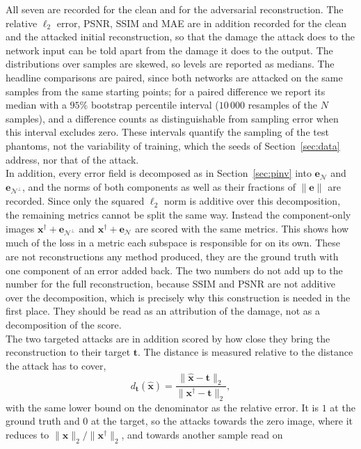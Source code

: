 \documentclass{article}
\numberwithin{equation}{section}
\begin{document}
All seven are recorded for the clean and for the adversarial reconstruction. The relative
$\ell_2$ error, PSNR, SSIM and MAE are in addition recorded for the clean and the attacked initial
reconstruction, so that the damage the attack does to the network input can be told apart from the
damage it does to the output.
The distributions over samples are skewed, so levels are reported as medians. The headline comparisons
are paired, since both networks are attacked on the same samples from the same starting points; for a
paired difference we report its median with a $95\%$ bootstrap percentile interval ($10\,000$ resamples
of the $N$ samples), and a difference counts as distinguishable from sampling error when this interval
excludes zero. These intervals quantify the sampling of the test phantoms, not the
variability of training, which the seeds of Section~\ref{sec:data} address, nor that of the attack.\\
In addition, every error field is decomposed as in Section~\ref{sec:pinv} into
$\mathbf{e}_\mathcal{N}$ and $\mathbf{e}_{\mathcal{N}^\perp}$, and the norms of
both components as well as their fractions of $\lVert\mathbf{e}\rVert$ are
recorded. Since only the squared $\ell_2$ norm is additive over this
decomposition, the remaining metrics cannot be split the same way.
Instead the component-only images $\mathbf{x}^\dagger+\mathbf{e}_{\mathcal{N}^\perp}$ and
$\mathbf{x}^\dagger+\mathbf{e}_\mathcal{N}$ are scored with the same metrics.
This shows how much of the loss in a metric each subspace is responsible for
on its own. These are not reconstructions any method produced, they are the ground truth with one component
of an error added back. The two numbers do not add up to the number for the
full reconstruction, because SSIM and PSNR are not additive over the
decomposition, which is precisely why this construction is needed in the first place.
They should be read as an attribution of the damage, not as a decomposition of the score.\\
The two targeted attacks are in addition scored by how close they bring the reconstruction to their
target $\mathbf{t}$. The distance is measured relative to the distance the attack has to cover,
\[d_\mathbf{t}(\hat{\mathbf{x}})=\frac{\lVert\hat{\mathbf{x}}-\mathbf{t}\rVert_2}
{\lVert\mathbf{x}^\dagger-\mathbf{t}\rVert_2},\]
with the same lower bound on the denominator as the relative error. It is $1$ at the ground truth and
$0$ at the target, so the attacks towards the zero image, where it reduces to
$\lVert\hat{\mathbf{x}}\rVert_2/\lVert\mathbf{x}^\dagger\rVert_2$, and towards another sample read on
\end{document}
